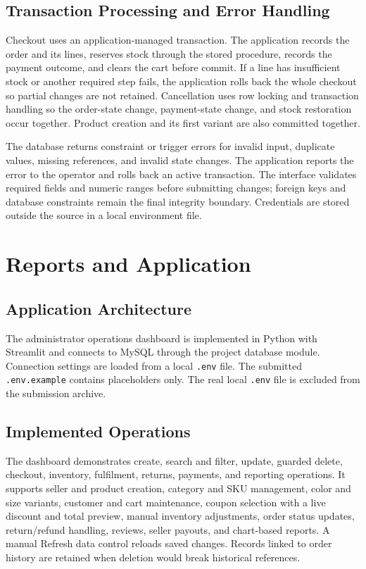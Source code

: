 \documentclass[11pt,a4paper,oneside]{report}
\begin{document}
\section{Transaction Processing and Error Handling}
Checkout uses an application-managed transaction. The application records the order and its lines, reserves stock through the stored procedure, records the payment outcome, and clears the cart before commit. If a line has insufficient stock or another required step fails, the application rolls back the whole checkout so partial changes are not retained. Cancellation uses row locking and transaction handling so the order-state change, payment-state change, and stock restoration occur together. Product creation and its first variant are also committed together.

The database returns constraint or trigger errors for invalid input, duplicate values, missing references, and invalid state changes. The application reports the error to the operator and rolls back an active transaction. The interface validates required fields and numeric ranges before submitting changes; foreign keys and database constraints remain the final integrity boundary. Credentials are stored outside the source in a local environment file.

\chapter{Reports and Application}
\section{Application Architecture}
The administrator operations dashboard is implemented in Python with Streamlit and connects to MySQL through the project database module. Connection settings are loaded from a local \texttt{.env} file. The submitted \texttt{.env.example} contains placeholders only. The real local \texttt{.env} file is excluded from the submission archive.

\section{Implemented Operations}
The dashboard demonstrates create, search and filter, update, guarded delete, checkout, inventory, fulfilment, returns, payments, and reporting operations. It supports seller and product creation, category and SKU management, color and size variants, customer and cart maintenance, coupon selection with a live discount and total preview, manual inventory adjustments, order status updates, return/refund handling, reviews, seller payouts, and chart-based reports. A manual Refresh data control reloads saved changes. Records linked to order history are retained when deletion would break historical references.
\end{document}
